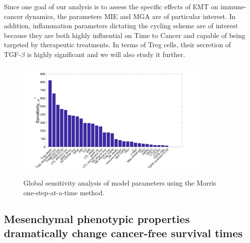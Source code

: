 \documentclass[11pt]{article}
\begin{document}
Since one goal of our analysis is to assess the specific effects of EMT on immune-cancer dynamics, the parameters MIE and MGA are of particular interest.
In addition, inflammation parameters dictating the cycling scheme are of interest because they are both highly influential on Time to Cancer and capable of being targeted by therapeutic treatments.
In terms of Treg cells, their secretion of TGF-$\beta$ is highly significant and we will also study it further.


\begin{figure}
\center
{\includegraphics[width=0.85\textwidth]{Figure2/Figure2.jpg}}
\caption{Global sensitivity analysis of model parameters using the Morris one-step-at-a-time method.}
\label{fig:MOAT}
\end{figure}




\subsection{Mesenchymal phenotypic properties dramatically change cancer-free survival times}\label{MesPars}
\end{document}
